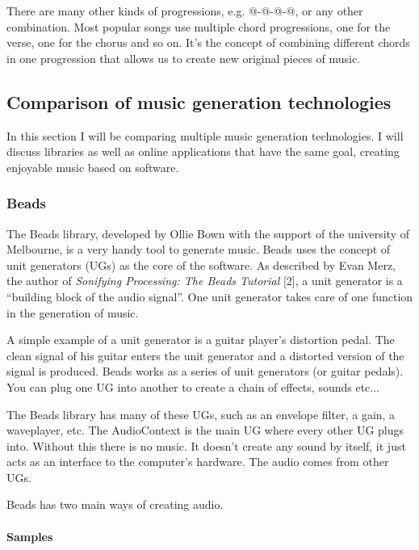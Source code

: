 \documentclass[12pt]{article}
\makeatletter
\newcommand*{\rom}[1]{\expandafter\@slowromancap\romannumeral #1@}
\makeatother
\begin{document}
There are many other kinds of progressions, e.g. \rom{1}-\rom{2}-\rom{5}-\rom{1}, or any other combination. Most popular songs use multiple chord progressions, one for the verse, one for the chorus and so on. It's the concept of combining different chords in one progression that allows us to create new original pieces of music.
\newpage

\subsection{Comparison of music generation technologies}

In this section I will be comparing multiple music generation technologies. I will discuss libraries as well as online applications that have the same goal, creating enjoyable music based on software.

\subsubsection{Beads}
The Beads library, developed by Ollie Bown with the support of the university of Melbourne, is a very handy tool to generate music. Beads uses the concept of unit generators (UGs) as the core of the software. As described by Evan Merz, the author of \textit{Sonifying Processing: The Beads Tutorial} [2], a unit generator is a ``building block of the audio signal''.  One unit generator takes care of one function in the generation of music. 
\newline

A simple example of a unit generator is a guitar player's distortion pedal. The clean signal of his guitar enters the unit generator and a distorted version of the signal is produced. Beads works as a series of unit generators (or guitar pedals). You can plug one UG into another to create a chain of effects, sounds etc... 
\newline

The Beads library has many of these UGs, such as an envelope filter, a gain, a waveplayer, etc. The AudioContext is the main UG where every other UG plugs into. Without this there is no music. It doesn't create any sound by itself, it just acts as an interface to the computer's hardware. The audio comes from other UGs.
\newline

Beads has two main ways of creating audio.

\paragraph{Samples}
\end{document}
